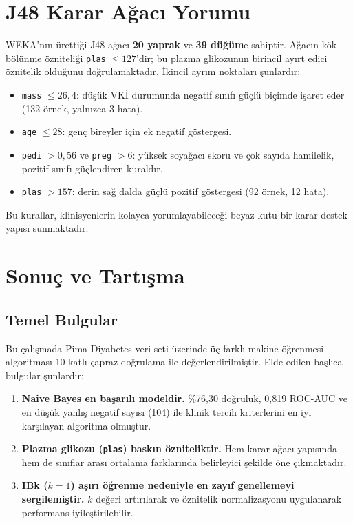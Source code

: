 \documentclass[12pt,a4paper]{article}
\begin{document}
\section{J48 Karar Ağacı Yorumu}

WEKA'nın ürettiği J48 ağacı \textbf{20 yaprak} ve \textbf{39 düğüm}e sahiptir.
Ağacın kök bölünme özniteliği \texttt{plas} $\leq 127$'dir; bu plazma
glikozunun birincil ayırt edici öznitelik olduğunu doğrulamaktadır.
İkincil ayrım noktaları şunlardır:

\begin{itemize}
  \item \texttt{mass} $\leq 26{,}4$: düşük VKİ durumunda negatif sınıfı güçlü
        biçimde işaret eder (132 örnek, yalnızca 3 hata).
  \item \texttt{age} $\leq 28$: genç bireyler için ek negatif göstergesi.
  \item \texttt{pedi} $> 0{,}56$ ve \texttt{preg} $> 6$: yüksek soyağacı skoru
        ve çok sayıda hamilelik, pozitif sınıfı güçlendiren kuraldır.
  \item \texttt{plas} $> 157$: derin sağ dalda güçlü pozitif göstergesi
        (92 örnek, 12 hata).
\end{itemize}

Bu kurallar, klinisyenlerin kolayca yorumlayabileceği beyaz-kutu bir karar
destek yapısı sunmaktadır.

\section{Sonuç ve Tartışma}

\subsection{Temel Bulgular}

Bu çalışmada Pima Diyabetes veri seti üzerinde üç farklı makine öğrenmesi
algoritması 10-katlı çapraz doğrulama ile değerlendirilmiştir.
Elde edilen başlıca bulgular şunlardır:

\begin{enumerate}
  \item \textbf{Naive Bayes en başarılı modeldir.} \%76{,}30 doğruluk,
        0{,}819 ROC-AUC ve en düşük yanlış negatif sayısı (104) ile klinik
        tercih kriterlerini en iyi karşılayan algoritma olmuştur.
  \item \textbf{Plazma glikozu (\texttt{plas}) baskın özniteliktir.}
        Hem karar ağacı yapısında hem de sınıflar arası ortalama farklarında
        belirleyici şekilde öne çıkmaktadır.
  \item \textbf{IBk ($k{=}1$) aşırı öğrenme nedeniyle en zayıf genellemeyi
        sergilemiştir.} $k$ değeri artırılarak ve öznitelik normalizasyonu
        uygulanarak performans iyileştirilebilir.
\end{enumerate}
\end{document}
